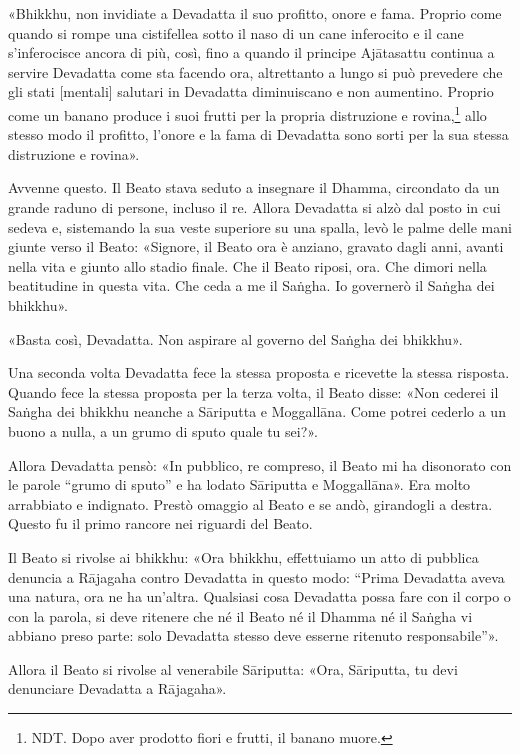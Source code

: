 «Bhikkhu, non invidiate a Devadatta il suo profitto, onore e fama. Proprio come
quando si rompe una cistifellea sotto il naso di un cane inferocito e il cane
s’inferocisce ancora di più, così, fino a quando il principe Ajātasattu continua
a servire Devadatta come sta facendo ora, altrettanto a lungo si può prevedere
che gli stati [mentali] salutari in Devadatta diminuiscano e non aumentino.
Proprio come un banano produce i suoi frutti per la propria distruzione e
rovina,\footnote{NDT. Dopo aver prodotto fiori e frutti, il banano muore.} allo
stesso modo il profitto, l’onore e la fama di Devadatta sono sorti per la sua
stessa distruzione e rovina».


Avvenne questo. Il Beato stava seduto a insegnare il Dhamma, circondato da un
grande raduno di persone, incluso il re. Allora Devadatta si alzò dal posto in
cui sedeva e, sistemando la sua veste superiore su una spalla, levò le palme
delle mani giunte verso il Beato: «Signore, il Beato ora è anziano, gravato
dagli anni, avanti nella vita e giunto allo stadio finale. Che il Beato riposi,
ora. Che dimori nella beatitudine in questa vita. Che ceda a me il Saṅgha. Io
governerò il Saṅgha dei bhikkhu».

«Basta così, Devadatta. Non aspirare al governo del Saṅgha dei bhikkhu».

Una seconda volta Devadatta fece la stessa proposta e ricevette la stessa
risposta. Quando fece la stessa proposta per la terza volta, il Beato disse:
«Non cederei il Saṅgha dei bhikkhu neanche a Sāriputta e Moggallāna. Come potrei
cederlo a un buono a nulla, a un grumo di sputo quale tu sei?».

Allora Devadatta pensò: «In pubblico, re compreso, il Beato mi ha disonorato con
le parole “grumo di sputo” e ha lodato Sāriputta e Moggallāna». Era molto
arrabbiato e indignato. Prestò omaggio al Beato e se andò, girandogli a destra.
Questo fu il primo rancore nei riguardi del Beato.

Il Beato si rivolse ai bhikkhu: «Ora bhikkhu, effettuiamo un atto di pubblica
denuncia a Rājagaha contro Devadatta in questo modo: “Prima Devadatta aveva una
natura, ora ne ha un’altra. Qualsiasi cosa Devadatta possa fare con il corpo o
con la parola, si deve ritenere che né il Beato né il Dhamma né il Saṅgha vi
abbiano preso parte: solo Devadatta stesso deve esserne ritenuto responsabile”».

Allora il Beato si rivolse al venerabile Sāriputta: «Ora, Sāriputta, tu devi
denunciare Devadatta a Rājagaha».

